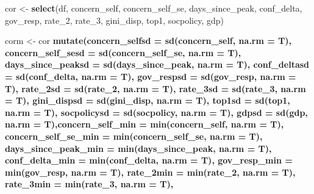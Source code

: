 \documentclass[
]{article}
\newenvironment{Shaded}{\begin{snugshade}}{\end{snugshade}}
\newcommand{\DataTypeTok}[1]{\textcolor[rgb]{0.13,0.29,0.53}{#1}}
\newcommand{\DecValTok}[1]{\textcolor[rgb]{0.00,0.00,0.81}{#1}}
\newcommand{\KeywordTok}[1]{\textcolor[rgb]{0.13,0.29,0.53}{\textbf{#1}}}
\newcommand{\NormalTok}[1]{#1}
\newcommand{\OperatorTok}[1]{\textcolor[rgb]{0.81,0.36,0.00}{\textbf{#1}}}
\newcommand{\StringTok}[1]{\textcolor[rgb]{0.31,0.60,0.02}{#1}}
\begin{document}
\begin{Shaded}
\begin{Highlighting}[]
\NormalTok{cor <-}\StringTok{ }\KeywordTok{select}\NormalTok{(df, concern_self, concern_self_se, days_since_peak, conf_delta, gov_resp, rate_}\DecValTok{2}\NormalTok{, rate_}\DecValTok{3}\NormalTok{, gini_disp, top1, socpolicy, gdp)}

\NormalTok{corm <-}\StringTok{ }\NormalTok{cor }\OperatorTok{%
\StringTok{  }\KeywordTok{mutate}\NormalTok{(}\DataTypeTok{concern_selfsd =} \KeywordTok{sd}\NormalTok{(concern_self, }\DataTypeTok{na.rm =}\NormalTok{ T),}
         \DataTypeTok{concern_self_sesd =} \KeywordTok{sd}\NormalTok{(concern_self_se, }\DataTypeTok{na.rm =}\NormalTok{ T),}
         \DataTypeTok{days_since_peaksd =} \KeywordTok{sd}\NormalTok{(days_since_peak, }\DataTypeTok{na.rm =}\NormalTok{ T),}
         \DataTypeTok{conf_deltasd =} \KeywordTok{sd}\NormalTok{(conf_delta, }\DataTypeTok{na.rm =}\NormalTok{ T),}
         \DataTypeTok{gov_respsd =} \KeywordTok{sd}\NormalTok{(gov_resp, }\DataTypeTok{na.rm =}\NormalTok{ T),}
         \DataTypeTok{rate_2sd =} \KeywordTok{sd}\NormalTok{(rate_}\DecValTok{2}\NormalTok{, }\DataTypeTok{na.rm =}\NormalTok{ T),}
         \DataTypeTok{rate_3sd =} \KeywordTok{sd}\NormalTok{(rate_}\DecValTok{3}\NormalTok{, }\DataTypeTok{na.rm =}\NormalTok{ T),}
         \DataTypeTok{gini_dispsd =} \KeywordTok{sd}\NormalTok{(gini_disp, }\DataTypeTok{na.rm =}\NormalTok{ T),}
         \DataTypeTok{top1sd =} \KeywordTok{sd}\NormalTok{(top1, }\DataTypeTok{na.rm =}\NormalTok{ T),}
         \DataTypeTok{socpolicysd =} \KeywordTok{sd}\NormalTok{(socpolicy, }\DataTypeTok{na.rm =}\NormalTok{ T),}
         \DataTypeTok{gdpsd =} \KeywordTok{sd}\NormalTok{(gdp, }\DataTypeTok{na.rm =}\NormalTok{ T),}\DataTypeTok{concern_self_min =} \KeywordTok{min}\NormalTok{(concern_self, }\DataTypeTok{na.rm =}\NormalTok{ T),}
         \DataTypeTok{concern_self_se_min =} \KeywordTok{min}\NormalTok{(concern_self_se, }\DataTypeTok{na.rm =}\NormalTok{ T),}
         \DataTypeTok{days_since_peak_min =} \KeywordTok{min}\NormalTok{(days_since_peak, }\DataTypeTok{na.rm =}\NormalTok{ T),}
         \DataTypeTok{conf_delta_min =} \KeywordTok{min}\NormalTok{(conf_delta, }\DataTypeTok{na.rm =}\NormalTok{ T),}
         \DataTypeTok{gov_resp_min =} \KeywordTok{min}\NormalTok{(gov_resp, }\DataTypeTok{na.rm =}\NormalTok{ T),}
         \DataTypeTok{rate_2min =} \KeywordTok{min}\NormalTok{(rate_}\DecValTok{2}\NormalTok{, }\DataTypeTok{na.rm =}\NormalTok{ T),}
         \DataTypeTok{rate_3min =} \KeywordTok{min}\NormalTok{(rate_}\DecValTok{3}\NormalTok{, }\DataTypeTok{na.rm =}\NormalTok{ T),}
}
\end{Highlighting}
\end{Shaded}
\end{document}
